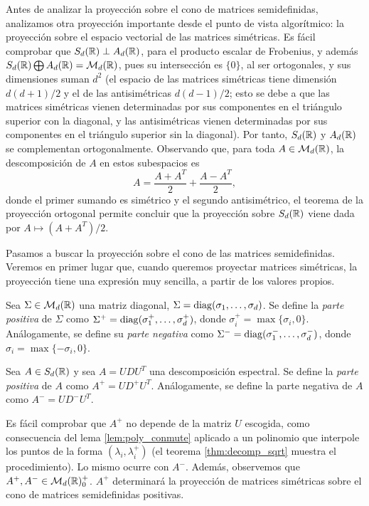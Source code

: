 Antes de analizar la proyección sobre el cono de matrices semidefinidas, analizamos otra proyección importante desde el punto de vista algorítmico: la proyección sobre el espacio vectorial de las matrices simétricas. Es fácil comprobar que $S_d(\mathbb{R}) \perp A_d(\mathbb{R})$, para el producto escalar de Frobenius, y además $S_d(\mathbb{R}) \bigoplus A_d(\mathbb{R}) = \mathcal{M}_d(\mathbb{R})$, pues su intersección es $\{0\}$, al ser ortogonales, y sus dimensiones suman $d^2$ (el espacio de las matrices simétricas tiene dimensión $d(d+1)/2$ y el de las antisimétricas $d(d-1)/2$; esto se debe a que las matrices simétricas vienen determinadas por sus componentes en el triángulo superior con la diagonal, y las antisimétricas vienen determinadas por sus componentes en el triángulo superior sin la diagonal). Por tanto, $S_d(\mathbb{R})$ y $A_d(\mathbb{R})$ se complementan ortogonalmente. Observando que, para toda $A \in \mathcal{M}_d(\mathbb{R})$, la descomposición de $A$ en estos subespacios es
\[ A = \frac{A + A^T}{2} + \frac{A - A^T}{2}, \]
donde el primer sumando es simétrico y el segundo antisimétrico, el teorema de la proyección ortogonal permite concluir que la proyección sobre $S_d(\mathbb{R})$ viene dada por $A \mapsto (A + A^T)/2$.

Pasamos a buscar la proyección sobre el cono de las matrices semidefinidas. Veremos en primer lugar que, cuando queremos proyectar matrices simétricas, la proyección tiene una expresión muy sencilla, a partir de los valores propios.

\begin{definition}
    Sea $\Sigma \in \mathcal{M}_d(\mathbb{R})$ una matriz diagonal, $\Sigma = \operatorname{diag}(\sigma_1,\dots,\sigma_d)$. Se define la \emph{parte positiva} de $\Sigma$ como $\Sigma^+ = \operatorname{diag}(\sigma_1^+,\dots,\sigma_d^+)$, donde $\sigma_i^+ = \max\{\sigma_i,0\}$. Análogamente, se define su \emph{parte negativa} como $\Sigma^- = \operatorname{diag}(\sigma_1^-,\dots,\sigma_d^-)$, donde $\sigma_i = \max\{-\sigma_i,0\}$.

    Sea $A \in S_d(\mathbb{R})$ y sea $A = UDU^T$ una descomposición espectral. Se define la \emph{parte positiva} de $A$ como $A^+ = UD^+U^T$. Análogamente, se define la parte negativa de $A$ como $A^- = UD^-U^T$.
\end{definition}

Es fácil comprobar que $A^+$ no depende de la matriz $U$ escogida, como consecuencia del lema \ref{lem:poly_conmute} aplicado a un polinomio que interpole los puntos de la forma $(\lambda_i,\lambda_i^+)$ (el teorema \ref{thm:decomp_sqrt} muestra el procedimiento). Lo mismo ocurre con $A^-$. Además, observemos que $A^+, A^- \in \mathcal{M}_d(\mathbb{R})^+_0$. $A^+$ determinará la proyección de matrices simétricas sobre el cono de matrices semidefinidas positivas.

